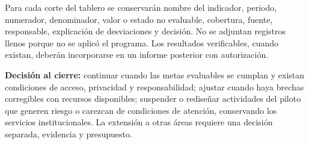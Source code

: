 \documentclass[12pt,letterpaper,oneside]{article}
\begin{document}
Para cada corte del tablero se conservarán nombre del indicador, periodo, numerador, denominador, valor o estado no evaluable, cobertura, fuente, responsable, explicación de desviaciones y decisión. No se adjuntan registros llenos porque no se aplicó el programa. Los resultados verificables, cuando existan, deberán incorporarse en un informe posterior con autorización.

\textbf{Decisión al cierre:} continuar cuando las metas evaluables se cumplan y existan condiciones de acceso, privacidad y responsabilidad; ajustar cuando haya brechas corregibles con recursos disponibles; suspender o rediseñar actividades del piloto que generen riesgo o carezcan de condiciones de atención, conservando los servicios institucionales. La extensión a otras áreas requiere una decisión separada, evidencia y presupuesto.
\end{document}
